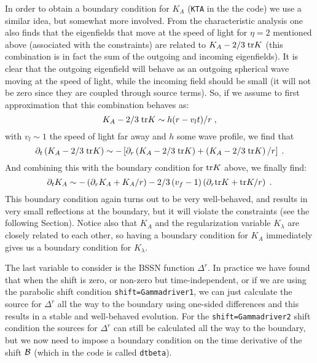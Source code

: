 \documentclass[12pt]{article}
\begin{document}
\vspace{3mm}

In order to obtain a boundary condition for $K_A$ (\texttt{KTA} in the
the code) we use a similar idea, but somewhat more involved. From the
characteristic analysis one also finds that the eigenfields that move
at the speed of light for $\eta=2$ mentioned above (associated with
the constraints) are related to $K_A - 2/3 \; {\rm tr} K$ (this
combination is in fact the sum of the outgoing and incoming
eigenfields).  It is clear that the outgoing eigenfield will behave as
an outgoing spherical wave moving at the speed of light, while the
incoming field should be small (it will not be zero since they are
coupled through source terms).  So, if we assume to first
approximation that this combination behaves as:
\begin{equation}
K_A - 2/3 \; {\rm tr} K \sim h(r - v_l t)/r \; ,
\end{equation}
with $v_l \sim 1$ the speed of light far away and $h$ some wave profile,
we find that
\begin{equation}
\partial_t \left( K_A - 2/3 \; {\rm tr} K \right)
\sim - \left[ \partial_r \left( K_A - 2/3 \; {\rm tr} K \right)
+ \left( K_A - 2/3 \; {\rm tr} K \right) / r \right] \; .
\end{equation}
And combining this with the boundary condition for ${\rm tr} K$ above, we
finally find:
\begin{equation}
\partial_t K_A \sim - \left( \partial_r K_A + K_A / r \right) 
- 2/3 \left( v_f - 1 \right)
\left( \partial_r {\rm tr} K + {\rm tr} K / r \right)\; .
\end{equation}
This boundary condition again turns out to be very well-behaved, and
results in very small reflections at the boundary, but it will violate
the constraints (see the following Section).  Notice also that $K_A$
and the regularization variable $K_\lambda$ are closely related to
each other, so having a boundary condition for $K_A$ immediately gives
us a boundary condition for $K_\lambda$. \\

\vspace{3mm}

The last variable to consider is the BSSN function $\Delta^r$.  In
practice we have found that when the shift is zero, or non-zero but
time-independent, or if we are using the parabolic shift condition
\texttt{shift=Gammadriver1}, we can just calculate the source for
$\Delta^r$ all the way to the boundary using one-sided differences
and this results in a stable and well-behaved evolution.  For the
\texttt{shift=Gammadriver2} shift condition the sources for $\Delta^r$
can still be calculated all the way to the boundary, but we now need
to impose a boundary condition on the time derivative of the shift
$\cal{B}$ (which in the code is called \texttt{dtbeta}).  \\
\end{document}
